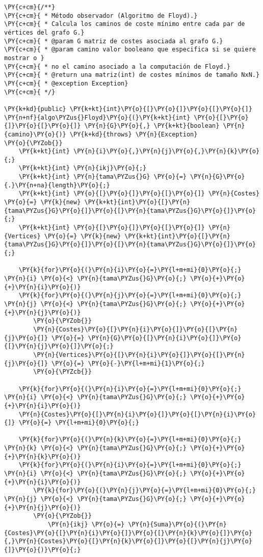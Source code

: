 \begin{Verbatim}[commandchars=\\\{\}]
\PY{c+cm}{/**}
\PY{c+cm}{ * Método observador (Algoritmo de Floyd).}
\PY{c+cm}{ * Calcula los caminos de coste mínimo entre cada par de vértices del grafo G.}
\PY{c+cm}{ * @param G matriz de costes asociada al grafo G.}
\PY{c+cm}{ * @param camino valor booleano que especifica si se quiere mostrar o }
\PY{c+cm}{ * no el camino asociado a la computación de Floyd.}
\PY{c+cm}{ * @return una matriz(int) de costes mínimos de tamaño NxN.}
\PY{c+cm}{ * @exception Exception}
\PY{c+cm}{ */}

\PY{k+kd}{public} \PY{k+kt}{int}\PY{o}{[}\PY{o}{]}\PY{o}{[}\PY{o}{]} \PY{n+nf}{algo\PYZus{}Floyd}\PY{o}{(}\PY{k+kt}{int} \PY{o}{[}\PY{o}{]}\PY{o}{[}\PY{o}{]} \PY{n}{G}\PY{o}{,} \PY{k+kt}{boolean} \PY{n}{camino}\PY{o}{)} \PY{k+kd}{throws} \PY{n}{Exception}
\PY{o}{\PYZob{}}
    \PY{k+kt}{int} \PY{n}{i}\PY{o}{,}\PY{n}{j}\PY{o}{,}\PY{n}{k}\PY{o}{;}
    \PY{k+kt}{int} \PY{n}{ikj}\PY{o}{;} 
    \PY{k+kt}{int} \PY{n}{tama\PYZus{}G} \PY{o}{=} \PY{n}{G}\PY{o}{.}\PY{n+na}{length}\PY{o}{;}
    \PY{k+kt}{int} \PY{o}{[}\PY{o}{]}\PY{o}{[}\PY{o}{]} \PY{n}{Costes} \PY{o}{=} \PY{k}{new} \PY{k+kt}{int}\PY{o}{[}\PY{n}{tama\PYZus{}G}\PY{o}{]}\PY{o}{[}\PY{n}{tama\PYZus{}G}\PY{o}{]}\PY{o}{;}
    \PY{k+kt}{int} \PY{o}{[}\PY{o}{]}\PY{o}{[}\PY{o}{]} \PY{n}{Vertices} \PY{o}{=} \PY{k}{new} \PY{k+kt}{int}\PY{o}{[}\PY{n}{tama\PYZus{}G}\PY{o}{]}\PY{o}{[}\PY{n}{tama\PYZus{}G}\PY{o}{]}\PY{o}{;}

    \PY{k}{for}\PY{o}{(}\PY{n}{i}\PY{o}{=}\PY{l+m+mi}{0}\PY{o}{;} \PY{n}{i} \PY{o}{<} \PY{n}{tama\PYZus{}G}\PY{o}{;} \PY{o}{+}\PY{o}{+}\PY{n}{i}\PY{o}{)}
	\PY{k}{for}\PY{o}{(}\PY{n}{j}\PY{o}{=}\PY{l+m+mi}{0}\PY{o}{;} \PY{n}{j} \PY{o}{<} \PY{n}{tama\PYZus{}G}\PY{o}{;} \PY{o}{+}\PY{o}{+}\PY{n}{j}\PY{o}{)}
	    \PY{o}{\PYZob{}}
		\PY{n}{Costes}\PY{o}{[}\PY{n}{i}\PY{o}{]}\PY{o}{[}\PY{n}{j}\PY{o}{]} \PY{o}{=} \PY{n}{G}\PY{o}{[}\PY{n}{i}\PY{o}{]}\PY{o}{[}\PY{n}{j}\PY{o}{]}\PY{o}{;}
		\PY{n}{Vertices}\PY{o}{[}\PY{n}{i}\PY{o}{]}\PY{o}{[}\PY{n}{j}\PY{o}{]} \PY{o}{=} \PY{o}{-}\PY{l+m+mi}{1}\PY{o}{;}
	    \PY{o}{\PYZcb{}}

    \PY{k}{for}\PY{o}{(}\PY{n}{i}\PY{o}{=}\PY{l+m+mi}{0}\PY{o}{;} \PY{n}{i} \PY{o}{<} \PY{n}{tama\PYZus{}G}\PY{o}{;} \PY{o}{+}\PY{o}{+}\PY{n}{i}\PY{o}{)}
	\PY{n}{Costes}\PY{o}{[}\PY{n}{i}\PY{o}{]}\PY{o}{[}\PY{n}{i}\PY{o}{]} \PY{o}{=} \PY{l+m+mi}{0}\PY{o}{;}

    \PY{k}{for}\PY{o}{(}\PY{n}{k}\PY{o}{=}\PY{l+m+mi}{0}\PY{o}{;} \PY{n}{k} \PY{o}{<} \PY{n}{tama\PYZus{}G}\PY{o}{;} \PY{o}{+}\PY{o}{+}\PY{n}{k}\PY{o}{)}
	\PY{k}{for}\PY{o}{(}\PY{n}{i}\PY{o}{=}\PY{l+m+mi}{0}\PY{o}{;} \PY{n}{i} \PY{o}{<} \PY{n}{tama\PYZus{}G}\PY{o}{;} \PY{o}{+}\PY{o}{+}\PY{n}{i}\PY{o}{)}
	    \PY{k}{for}\PY{o}{(}\PY{n}{j}\PY{o}{=}\PY{l+m+mi}{0}\PY{o}{;} \PY{n}{j} \PY{o}{<} \PY{n}{tama\PYZus{}G}\PY{o}{;} \PY{o}{+}\PY{o}{+}\PY{n}{j}\PY{o}{)}
		\PY{o}{\PYZob{}}
		    \PY{n}{ikj} \PY{o}{=} \PY{n}{Suma}\PY{o}{(}\PY{n}{Costes}\PY{o}{[}\PY{n}{i}\PY{o}{]}\PY{o}{[}\PY{n}{k}\PY{o}{]}\PY{o}{,}\PY{n}{Costes}\PY{o}{[}\PY{n}{k}\PY{o}{]}\PY{o}{[}\PY{n}{j}\PY{o}{]}\PY{o}{)}\PY{o}{;}
			

\end{Verbatim}
